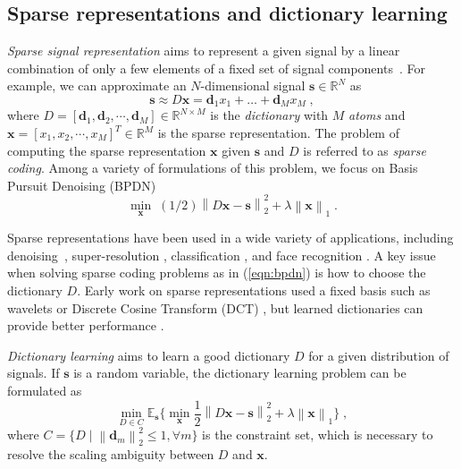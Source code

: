 \documentclass[final]{siamart1116}
\newcommand{\mb}[1]{\mathbf{#1}}
\providecommand{\norm}[1]{\left\lVert#1\right\rVert}
\def \E  {\mathbb{E}}
\def \R  {\mathbb{R}}
\begin{document}
\subsection{Sparse representations and dictionary learning}

\emph{Sparse signal representation} aims to represent a given signal by a linear combination of only a few elements of a fixed set of signal components~\cite{mairal-2014-sparse}. For example, we can approximate an $N$-dimensional signal $\mb{s}\in\R^N$ as
\begin{equation}
\label{eqn:sparse-coding}
\mb{s} \approx D \mb{x} = \mb{d}_1 x_1 + \ldots + \mb{d}_M x_M \;,
\end{equation}
where $D = [\mb{d}_1, \mb{d}_2, \cdots, \mb{d}_M] \in \R^{N\times M}$
is the \emph{dictionary} with $M$ \emph{atoms} and $\mb{x} = [x_1, x_2, \cdots, x_M]^T \in\R^M$ is the sparse representation. The problem of computing the sparse representation $\mb{x}$ given $\mb{s}$ and $D$ is referred to as \emph{sparse coding}. Among a variety of formulations of this problem, we focus on Basis Pursuit Denoising (BPDN)~\cite{chen-1998-atomic}
\begin{equation}
\label{eqn:bpdn}
\min_{\mb{x}} \; (1/2)\norm{D\mb{x}-\mb{s}}_2^2 + \lambda \norm{\mb{x}}_1 \;.
\end{equation}

Sparse representations have been used in a wide variety of applications, including denoising~\cite{elad2006image, mairal-2014-sparse}, super-resolution \cite{yang2010image, zhang2015survey}, classification \cite{wright2009robust}, and face recognition \cite{wright2010sparse}. A key issue when solving sparse coding problems as in (\ref{eqn:bpdn}) is how to choose the dictionary $D$. Early work on sparse representations used a fixed basis \cite{rubinstein2010dictionaries} such as wavelets \cite{mallat1999wavelet} or Discrete Cosine Transform (DCT) \cite{huang2007sparse},  but learned dictionaries can provide better performance \cite{aharon2006rm, elad2006image}.

\emph{Dictionary learning} aims to learn a good dictionary $D$ for a given distribution of signals. If $\mb{s}$ is a random variable,
the dictionary learning problem can be formulated as
\begin{equation}
\label{eqn:dl}
\min_{D\in C} \E_{\mb{s}} \bigg\{ \min_{\mb{x}} \frac{1}{2}\norm{D\mb{x}-\mb{s}}_2^2 + \lambda \norm{\mb{x}}_1\bigg\} \;,
\end{equation}
where $C = \{D \;|\; \norm{\mb{d}_m}_2^2 \leq1,\forall m\}$ is the constraint set, which is necessary to resolve the scaling ambiguity between $D$ and $\mb{x}$.
\end{document}
